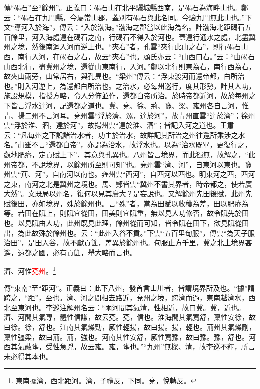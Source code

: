 {\noindent\zhuan{}\fzbyks 傳“碣石”至“餘州”。正義曰：碣石山在北平驪城縣西南，是碣石為海畔山也。鄭云：“碣石在九門縣，今屬常山郡，蓋別有碣石與此名同。今驗九門無此山也。”下文“導河入於海”，傳云：“入於渤海。”渤海之郡當以此海為名。計渤海北距碣石五百餘里，河入海處遠在碣石之南，行碣石不得入於河也。蓋遠行通水之處，北盡冀州之境，然後南迴入河而逆上也。“夾右”者，孔雲“夾行此山之右”，則行碣石山西，南行入河，在碣石之右，故云“夾右”也。顧氏亦云：“山西曰右。”云：“由碣石山西北行，盡冀州之境，還從山東南行，入河。”鄭以北行則東為右，南行西為右，故夾山兩旁，山常居右，與孔異也。“梁州”傳云：“浮東渡河而還帝都，白所治也。”則入河逆上，為還都白所治也。之治水，必每州巡行，度其形勢，計其人功，施設規模，指授方略，令人分佈並作，還都白帝所治。於時帝都近河，故於每州之下皆言浮水達河，記還都之道也。冀、兗、徐、荊、豫、梁、雍州各自言河，惟青、揚二州不言河耳。兗州雲“浮於濟、漯，達於河”，故青州直雲“達於濟”；徐州雲“浮於淮、泗，達於河”，故揚州雲“達於淮、泗”；皆記入河之道也。王肅云：“凡每州之下說諸治水者，功主於治水，故詳記其所治之州往還所乘涉之水名。”肅雖不言“還都白帝”，亦謂為治水，故浮水也。以為“治水既畢，更復行之，觀地肥瘠，定貢賦上下”．其意與孔異也。八州皆言境界，而此獨無，故解之，“此州帝都，不說境界，以餘州所至則可知”也。兗州雲“濟、河”，自東河以東也。豫州雲“荊、河”，自南河以南也。雍州雲“西河”，自西河以西也。明東河之西，西河之東，南河之北是冀州之境也。馬、鄭皆雲“冀州不書其界者，時帝都之，使若廣大然”。文既局以州名，復何以見其廣大？是妄說也。又解餘州先田後賦，此州先賦後田，亦如境界，殊於餘州也。言“殊”者，當為田賦以收穫為差，田以肥瘠為等。若田在賦上，則賦宜從田，田美則宜賦重，無以見人功修否，故令賦先於田也。以見賦由人功，此州既見此理，餘州從而可知，皆令賦在田下，欲見賦從田出，為此故殊於餘州也。云：“此州入谷不貢。”下雲“五百里甸服”，傳雲“為天子服治田”，是田入谷，故不獻貢篚，差異於餘州也。甸服止方千里，冀之北土境界甚遙，遠都之國，必有貢篚，舉大略而言也。 \par}

濟、河惟\textcolor{red}{兗州}。\footnote{東南據濟，西北距河。濟，子禮反，下同。兗，悅轉反。}

{\noindent\zhuan{}\fzbyks 傳“東南”至“距河”。正義曰：此下八州，發首言山川者，皆謂境界所及也。“據”謂跨之，“距”，至也。濟、河之間相去路近，兗州之境，跨濟而過，東南越濟水，西北至東河也。李巡注解州名云：“兩河間其氣清，性相近，故曰冀。冀，近也。濟、河間其氣專，體性信謙，故云兗。兗，信也。淮海間其氣寬舒，稟性安徐，故曰徐。徐，舒也。江南其氣燥勁，厥性輕揚，故曰揚。揚，輕也。荊州其氣燥剛，稟性彊梁，故曰荊。荊，強也。河南其性安舒，厥性寬豫，故曰豫。豫，舒也。河西其氣蔽壅，受性急兇，故云雍。雍，壅也。”“九州”無樑、清，故李巡不釋，所言未必得其本也。 \par}

